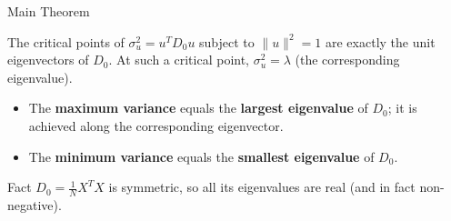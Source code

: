 \documentclass[aspectratio=169]{beamer}
\newcommand{\norm}[1]{\lVert #1 \rVert}
\begin{document}
\begin{frame}{Main Theorem}
  \begin{theorem}
    The critical points of $\sigma_{u}^{2} = u^{T}D_{0}u$ subject to
    $\norm{u}^{2}=1$ are exactly the unit eigenvectors of $D_{0}$.
    At such a critical point, $\sigma_{u}^{2} = \lambda$ (the
    corresponding eigenvalue).
  \end{theorem}

  \bigskip
  \begin{itemize}
    \item The \textbf{maximum variance} equals the \textbf{largest eigenvalue}
      of $D_{0}$; it is achieved along the corresponding eigenvector.
    \item The \textbf{minimum variance} equals the \textbf{smallest eigenvalue}
      of $D_{0}$.
  \end{itemize}

  \bigskip
  \begin{block}{Fact}
    $D_{0} = \tfrac{1}{N}X^{T}X$ is symmetric, so all its eigenvalues
    are real (and in fact non-negative).
  \end{block}
\end{frame}
\end{document}
